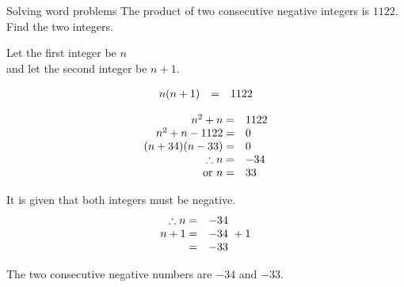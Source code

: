 \begin{wex}
{Solving word problems }
{
The product of two consecutive negative integers is $1122$. Find the two integers.
} 
{
Let the first integer be $n$ 
\\and let the second integer be $n+1$. 

\begin{equation*}
\begin{array}{cll}\hfill n(n+1)& =& 1122\hfill \end{array}
\end{equation*}

\begin{equation*}
    \begin{array}{cll}
	\hfill n^{2} + n =& 1122\hfill \\
\hfill n^{2} + n - 1122 =& 0\hfill \\
\hfill (n+34)(n-33) =& 0\hfill \\
	\hfill \therefore  n =& -34 \hfill \\
\hfill \mbox{ or } n =& 33\hfill 
    \end{array}
\end{equation*}

It is given that both integers must be negative.
\begin{equation*}
    \begin{array}{cll}
	\hfill \therefore n =& -34\hfill \\
\hfill n + 1 =& -34\ + 1 \hfill \\
\hfill  =& -33\hfill \\

    \end{array}
\end{equation*}

The two consecutive negative numbers are $-34$ and $-33$.
}
\end{wex}

